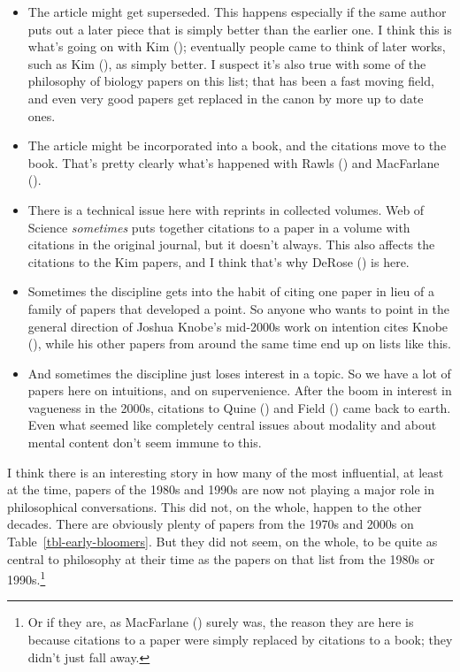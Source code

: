 \documentclass[
  10pt,
  letterpaper,
  DIV=11,
  numbers=noendperiod,
  twoside]{scrartcl}
\providecommand{\tightlist}{%
  \setlength{\itemsep}{0pt}\setlength{\parskip}{0pt}}\usepackage{longtable,booktabs,array}
\begin{document}
\begin{itemize}
\tightlist
\item
  The article might get superseded. This happens especially if the same
  author puts out a later piece that is simply better than the earlier
  one. I think this is what's going on with Kim
  (); eventually people came to
  think of later works, such as Kim
  (), as simply better. I suspect
  it's also true with some of the philosophy of biology papers on this
  list; that has been a fast moving field, and even very good papers get
  replaced in the canon by more up to date ones.
\item
  The article might be incorporated into a book, and the citations move
  to the book. That's pretty clearly what's happened with Rawls
  () and MacFarlane
  ().
\item
  There is a technical issue here with reprints in collected volumes.
  Web of Science \emph{sometimes} puts together citations to a paper in
  a volume with citations in the original journal, but it doesn't
  always. This also affects the citations to the Kim papers, and I think
  that's why DeRose () is here.
\item
  Sometimes the discipline gets into the habit of citing one paper in
  lieu of a family of papers that developed a point. So anyone who wants
  to point in the general direction of Joshua Knobe's mid-2000s work on
  intention cites Knobe (), while
  his other papers from around the same time end up on lists like this.
\item
  And sometimes the discipline just loses interest in a topic. So we
  have a lot of papers here on intuitions, and on supervenience. After
  the boom in interest in vagueness in the 2000s, citations to Quine
  () and Field
  () came back to earth. Even what
  seemed like completely central issues about modality and about mental
  content don't seem immune to this.
\end{itemize}

I think there is an interesting story in how many of the most
influential, at least at the time, papers of the 1980s and 1990s are now
not playing a major role in philosophical conversations. This did not,
on the whole, happen to the other decades. There are obviously plenty of
papers from the 1970s and 2000s on Table~\ref{tbl-early-bloomers}. But
they did not seem, on the whole, to be quite as central to philosophy at
their time as the papers on that list from the 1980s or
1990s.\footnote{Or if they are, as MacFarlane
  () surely was, the reason they
  are here is because citations to a paper were simply replaced by
  citations to a book; they didn't just fall away.}
\end{document}
